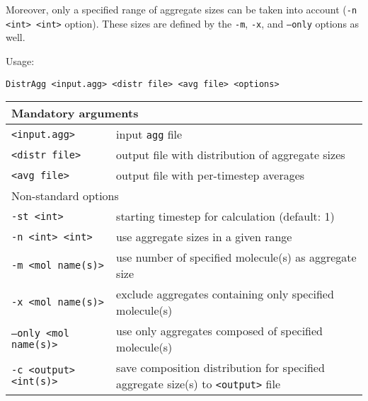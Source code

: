 Moreover, only a specified range of aggregate sizes can be taken into
account (\texttt{-n <int> <int>} option). These sizes are defined by the
\texttt{-m}, \texttt{-x}, and \texttt{--only} options as well.

Usage:

\vspace{1em}
\noindent
\texttt{DistrAgg <input.agg> <distr file> <avg file> <options>}

\noindent
\begin{longtable}{p{}p{}}
  \toprule
  \multicolumn{2}{l}{Mandatory arguments} \\
  \midrule
  \texttt{<input.agg>} & input \texttt{agg} file \\
  \texttt{<distr file>} & output file with distribution of aggregate
    sizes \\
  \texttt{<avg file>} & output file with per-timestep averages \\
  \toprule
  \multicolumn{2}{l}{Non-standard options} \\
  \midrule
  \texttt{-st <int>} & starting timestep for calculation (default: 1) \\
  \texttt{-n <int> <int>} & use aggregate sizes in a given range \\
  \texttt{-m <mol name(s)>} & use number of specified molecule(s) as
    aggregate size \\
  \texttt{-x <mol name(s)>} & exclude aggregates containing only specified
    mole\-cule(s) \\
  \texttt{--only <mol name(s)>} & use only aggregates composed of specified
    molecule(s) \\
  \texttt{-c <output> <int(s)>} & save composition distribution for
    specified aggregate size(s) to \texttt{<output>} file \\
  \bottomrule
\end{longtable}

